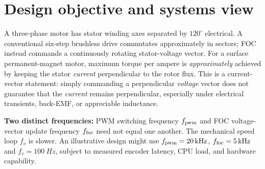\documentclass[10pt,letterpaper]{article}
\begin{document}
\section{Design objective and systems view}
A three-phase motor has stator winding axes separated by $120^\circ$ electrical. A conventional six-step brushless drive commutates approximately in sectors; FOC instead commands a continuously rotating stator-voltage vector. For a surface permanent-magnet motor, maximum torque per ampere is \emph{approximately} achieved by keeping the stator \emph{current} perpendicular to the rotor flux. This is a current-vector statement: simply commanding a perpendicular \emph{voltage} vector does not guarantee that the \emph{current} remains perpendicular, especially under electrical transients, back-EMF, or appreciable inductance.

\begin{center}
\end{center}
\textbf{Two distinct frequencies:} PWM switching frequency $f_{\rm pwm}$ and FOC voltage-vector update frequency $f_{\rm foc}$ need not equal one another. The mechanical speed loop $f_v$ is slower. An illustrative design might use $f_{\rm pwm}=\SI{20}{kHz}$, $f_{\rm foc}=\SI{5}{kHz}$ and $f_v=\SI{100}{Hz}$, subject to measured encoder latency, CPU load, and hardware capability.
\end{document}
